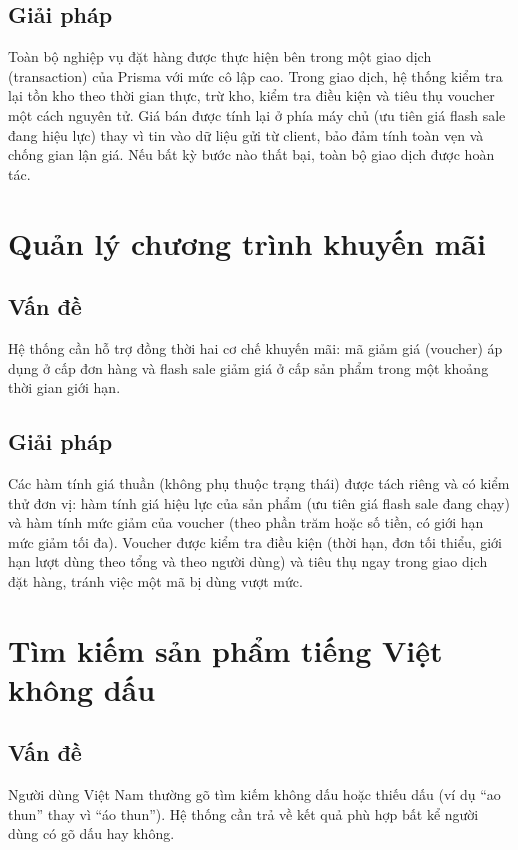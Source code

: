 \subsection{Giải pháp}
Toàn bộ nghiệp vụ đặt hàng được thực hiện bên trong một giao dịch (transaction) của Prisma với
mức cô lập cao. Trong giao dịch, hệ thống kiểm tra lại tồn kho theo thời gian thực, trừ kho, kiểm
tra điều kiện và tiêu thụ voucher một cách nguyên tử. Giá bán được tính lại ở phía máy chủ (ưu
tiên giá flash sale đang hiệu lực) thay vì tin vào dữ liệu gửi từ client, bảo đảm tính toàn vẹn và
chống gian lận giá. Nếu bất kỳ bước nào thất bại, toàn bộ giao dịch được hoàn tác.

\section{Quản lý chương trình khuyến mãi}

\subsection{Vấn đề}
Hệ thống cần hỗ trợ đồng thời hai cơ chế khuyến mãi: mã giảm giá (voucher) áp dụng ở cấp đơn
hàng và flash sale giảm giá ở cấp sản phẩm trong một khoảng thời gian giới hạn.

\subsection{Giải pháp}
Các hàm tính giá thuần (không phụ thuộc trạng thái) được tách riêng và có kiểm thử đơn vị: hàm
tính giá hiệu lực của sản phẩm (ưu tiên giá flash sale đang chạy) và hàm tính mức giảm của
voucher (theo phần trăm hoặc số tiền, có giới hạn mức giảm tối đa). Voucher được kiểm tra điều
kiện (thời hạn, đơn tối thiểu, giới hạn lượt dùng theo tổng và theo người dùng) và tiêu thụ ngay
trong giao dịch đặt hàng, tránh việc một mã bị dùng vượt mức.

\section{Tìm kiếm sản phẩm tiếng Việt không dấu}

\subsection{Vấn đề}
Người dùng Việt Nam thường gõ tìm kiếm không dấu hoặc thiếu dấu (ví dụ ``ao thun'' thay vì ``áo
thun''). Hệ thống cần trả về kết quả phù hợp bất kể người dùng có gõ dấu hay không.

